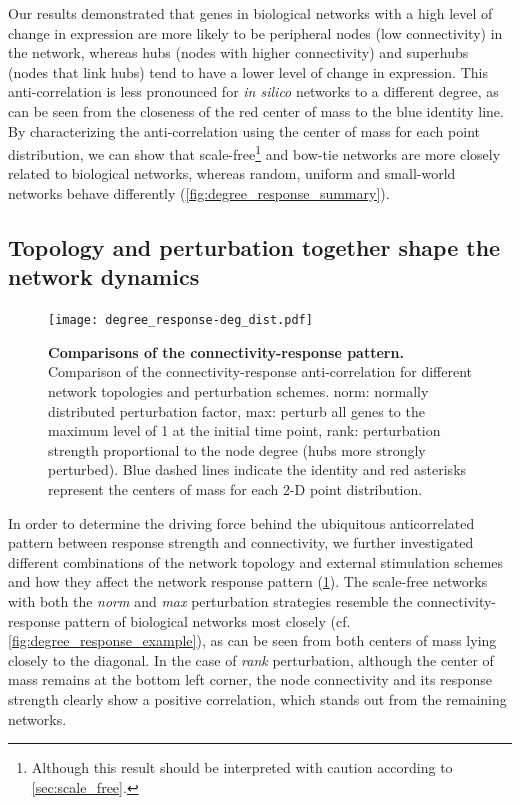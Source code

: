 Our results demonstrated that genes in biological networks with a high level 
of change in expression are more likely to be peripheral nodes 
(low connectivity) in the network, whereas hubs (nodes with higher 
connectivity) and superhubs (nodes that link hubs) tend to have a lower level 
of change in expression. This anti-correlation is less pronounced for  
\emph{in silico} networks to a different degree, as can be seen from the closeness
of the red center of mass to the blue identity line. By characterizing the 
anti-correlation using the center of mass for each point distribution, we
can show that scale-free\footnote{Although this result should be interpreted 
with caution according to \ref{sec:scale_free}.} and bow-tie networks are more closely related to
biological networks, whereas random, uniform and small-world networks behave
differently (\ref{fig:degree_response_summary}).

\subsection{Topology and perturbation together shape the network dynamics}

\begin{figure}[!ht]
\begin{center}
\texttt{[image: degree\_response-deg\_dist.pdf]}
\end{center}
\caption[Combination of topology and perturbation]{
{\bf Comparisons of the connectivity-response pattern.} 
Comparison of the connectivity-response
anti-correlation for different network topologies and
perturbation schemes. norm: normally distributed perturbation
factor, max: perturb all genes to the maximum level of 1 at
the initial time point, rank: perturbation strength
proportional to the node degree (hubs more strongly
perturbed).
Blue dashed lines indicate the identity and red asterisks 
represent the centers of mass for each 2-D point distribution.
}
\label{fig:degree_response_deg_dist}
\end{figure}

In order to determine the driving force behind the ubiquitous
anticorrelated pattern between response strength and connectivity, we
further investigated different combinations of the network topology and
external stimulation schemes and how they affect the network response
pattern (\ref{fig:degree_response_deg_dist}). 
The scale-free networks with both the \emph{norm} and \emph{max}
perturbation strategies resemble the connectivity-response pattern of 
biological networks most closely (cf. \ref{fig:degree_response_example}), 
as can be seen from both centers of mass
lying closely to the diagonal. In the case of \emph{rank} perturbation,
although the center of mass remains at the bottom left corner, the node
connectivity and its response strength clearly show a positive correlation,
which stands out from the remaining networks. 


